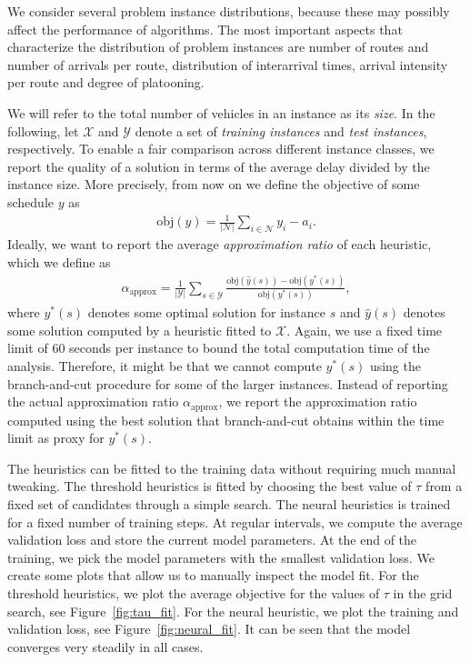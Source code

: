 \documentclass[a4paper]{article}
\theoremstyle{definition}
\theoremstyle{plain}
\begin{document}
We consider several problem instance distributions, because these may possibly
affect the performance of algorithms. The most important aspects that
characterize the distribution of problem instances are number of routes and
number of arrivals per route, distribution of interarrival times, arrival
intensity per route and degree of platooning.

We will refer to the total number of vehicles in an instance as its \textit{size}.
%
In the following, let $\mathcal{X}$ and $\mathcal{Y}$ denote a set of \textit{training instances}
and \textit{test instances}, respectively.
%
To enable a fair comparison across different instance classes, we report the
quality of a solution in terms of the average delay divided by the
instance size. More precisely, from now on we define the objective of some schedule $y$ as
\begin{align*}
  \textrm{obj}(y) = \frac{1}{|\mathcal{N}|} \sum_{i \in \mathcal{N}} y_{i} - a_{i} .
\end{align*}
%
Ideally, we want to report the average \textit{approximation ratio} of each
heuristic, which we define as
\begin{align*}
  \alpha_{\text{approx}} = \frac{1}{|\mathcal{Y}|} \sum_{s \in \mathcal{Y}} \frac{\textrm{obj}(\hat{y}(s)) - \textrm{obj}(y^{*}(s))}{\textrm{obj}(y^{*}(s))} ,
\end{align*}
where $y^{*}(s)$ denotes some optimal solution for instance $s$ and $\hat{y}(s)$
denotes some solution computed by a heuristic fitted to $\mathcal{X}$.
%
Again, we use a fixed time limit of 60 seconds per instance to bound the total
computation time of the analysis. Therefore, it might be that we cannot compute $y^{*}(s)$ using
the branch-and-cut procedure for some of the larger instances.
%
Instead of reporting the actual approximation ratio $\alpha_{\text{approx}}$, we
report the approximation ratio computed using the best solution that
branch-and-cut obtains within the time limit as proxy for $y^{*}(s)$.

The heuristics can be fitted to the training data without requiring much manual tweaking.
%
The threshold heuristics is fitted by choosing the best value of $\tau$ from a fixed set of candidates through a simple search.
The neural heuristics is trained for a fixed number of training steps. At regular intervals, we compute the average validation loss and store the current model parameters. At the end of the training, we pick the model parameters with the smallest validation loss.
%
We create some plots that allow us to manually inspect the model fit.
For the threshold heuristics, we plot the average objective for the values of
$\tau$ in the grid search, see Figure~\ref{fig:tau_fit}.
%
For the neural heuristic, we plot the training and validation loss, see
Figure~\ref{fig:neural_fit}. It can be seen that the model converges very steadily in all cases.
\end{document}
